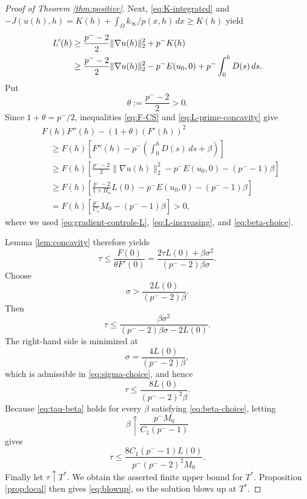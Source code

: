 \documentclass[12pt,reqno]{amsart}
\theoremstyle{definition}
\theoremstyle{remark}
\numberwithin{equation}{section}
\begin{document}
\begin{proof}[Proof of Theorem \ref{thm:positive}]
	Next, \eqref{eq:K-integrated} and $-J(u(h),h)=K(h)+\int_\Omega k_\infty/p(x,h)\,dx\ge K(h)$ yield
	\begin{align}
	L'(h)
	&\ge \frac{p^- -2}{2}\|\nabla u(h)\|_2^2+p^-K(h)\notag\\
	&\ge \frac{p^- -2}{2}\|\nabla u(h)\|_2^2
	-p^-E(u_0,0)+p^-\int_0^hD(s)\,ds. \label{eq:L-prime-concavity}
	\end{align}
	Put
	\[
	\theta:=\frac{p^- -2}{2}>0.
	\]
	Since $1+\theta=p^-/2$, inequalities \eqref{eq:F-CS} and \eqref{eq:L-prime-concavity} give
	\begin{align*}
	&F(h)F''(h)-(1+\theta)(F'(h))^2\\
	&\quad\ge F(h)\left[
	F''(h)-p^-\left(\int_0^hD(s)\,ds+\beta\right)
	\right]\\
	&\quad\ge F(h)\left[
	\frac{p^- -2}{2}\|\nabla u(h)\|_2^2
	-p^-E(u_0,0)-(p^- -1)\beta
	\right]\\
	&\quad\ge F(h)\left[
	\frac{p^- -2}{1+H_n}L(0)
	-p^-E(u_0,0)-(p^- -1)\beta
	\right]\\
	&\quad=F(h)\left[
	\frac{p^-}{C_1}M_0-(p^- -1)\beta
	\right]>0,
	\end{align*}
	where we used \eqref{eq:gradient-controls-L}, \eqref{eq:L-increasing}, and \eqref{eq:beta-choice}.

	Lemma \ref{lem:concavity} therefore yields
	\[
	\tau\le\frac{F(0)}{\theta F'(0)}
	=\frac{2\tau L(0)+\beta\sigma^2}
	{(p^- -2)\beta\sigma}.
	\]
	Choose
	\begin{equation}\label{eq:sigma-choice}
	\sigma>\frac{2L(0)}{(p^- -2)\beta}.
	\end{equation}
	Then
	\[
	\tau\le
	\frac{\beta\sigma^2}
	{(p^- -2)\beta\sigma-2L(0)}.
	\]
	The right-hand side is minimized at
	\[
	\sigma=\frac{4L(0)}{(p^- -2)\beta},
	\]
	which is admissible in \eqref{eq:sigma-choice}, and hence
	\begin{equation}\label{eq:tau-beta}
	\tau\le\frac{8L(0)}{(p^- -2)^2\beta}.
	\end{equation}
	Because \eqref{eq:tau-beta} holds for every $\beta$ satisfying \eqref{eq:beta-choice}, letting
	\[
	\beta\uparrow\frac{p^-M_0}{C_1(p^- -1)}
	\]
	gives
	\[
	\tau\le
	\frac{8C_1(p^- -1)L(0)}
	{p^-(p^- -2)^2M_0}.
	\]
	Finally let $\tau\uparrow T^*$. We obtain the asserted finite upper bound for $T^*$.
	Proposition \ref{prop:local} then gives \eqref{eq:blowup}, so the solution blows up at $T^*$.
\end{proof}
\end{document}
